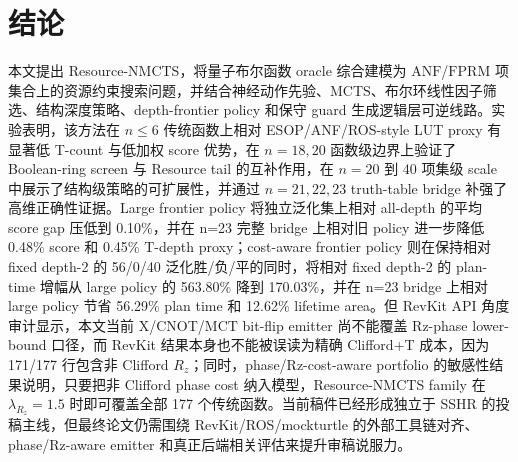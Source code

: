 \documentclass[UTF8,fontset=macnew,11pt]{ctexart}
\newcommand{\method}{Resource-NMCTS}
\newcommand{\screen}{Boolean-ring screen}
\newcommand{\anf}{\ensuremath{\mathrm{ANF}}}
\newcommand{\fprm}{\ensuremath{\mathrm{FPRM}}}
\newcommand{\mcts}{\ensuremath{\mathrm{MCTS}}}
\newcommand{\mct}{\ensuremath{\mathrm{MCT}}}
\begin{document}
\section{结论}

本文提出 \method{}，将量子布尔函数 oracle 综合建模为 \anf{}/\fprm{} 项集合上的资源约束搜索问题，并结合神经动作先验、\mcts{}、布尔环线性因子筛选、结构深度策略、depth-frontier policy 和保守 guard 生成逻辑层可逆线路。实验表明，该方法在 $n\leq6$ 传统函数上相对 ESOP/ANF/ROS-style LUT proxy 有显著低 T-count 与低加权 score 优势，在 $n=18,20$ 函数级边界上验证了 \screen{} 与 Resource tail 的互补作用，在 $n=20$ 到 $40$ 项集级 scale 中展示了结构级策略的可扩展性，并通过 $n=21,22,23$ truth-table bridge 补强了高维正确性证据。Large frontier policy 将独立泛化集上相对 all-depth 的平均 score gap 压低到 0.10\%，并在 n=23 完整 bridge 上相对旧 policy 进一步降低 0.48\% score 和 0.45\% T-depth proxy；cost-aware frontier policy 则在保持相对 fixed depth-2 的 56/0/40 泛化胜/负/平的同时，将相对 fixed depth-2 的 plan-time 增幅从 large policy 的 563.80\% 降到 170.03\%，并在 n=23 bridge 上相对 large policy 节省 56.29\% plan time 和 12.62\% lifetime area。但 RevKit API 角度审计显示，本文当前 X/CNOT/\mct{} bit-flip emitter 尚不能覆盖 Rz-phase lower-bound 口径，而 RevKit 结果本身也不能被误读为精确 Clifford+T 成本，因为 171/177 行包含非 Clifford $R_z$；同时，phase/Rz-cost-aware portfolio 的敏感性结果说明，只要把非 Clifford phase cost 纳入模型，Resource-NMCTS family 在 $\lambda_{R_z}=1.5$ 时即可覆盖全部 177 个传统函数。当前稿件已经形成独立于 SSHR 的投稿主线，但最终论文仍需围绕 RevKit/ROS/mockturtle 的外部工具链对齐、phase/Rz-aware emitter 和真正后端相关评估来提升审稿说服力。
\end{document}
